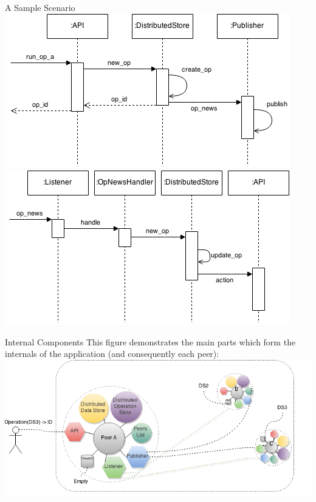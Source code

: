 \documentclass[final,hyperref={pdfpagelabels=true}]{beamer}
\begin{document}
\begin{frame}
\begin{columns}[t]
\begin{column}{.45\textwidth}
\begin{block}{A Sample Scenario}
               \includegraphics[]{kseq}             \includegraphics[]{kseq2}
      \end{block}
      
      \begin{block}{Internal Components}
      This figure demonstrates the main parts which form the internals of the application (and consequently each peer):\\
      
      \includegraphics[width=\textwidth]{sys2}
      

\end{block}
\end{column}
\end{columns}
\end{frame}
\end{document}
